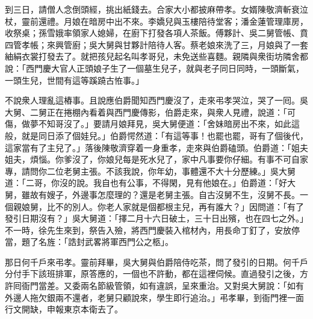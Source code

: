 到三日，請僧人念倒頭經，挑出紙錢去。合家大小都披麻帶孝。女婿陳敬濟斬衰泣杖，靈前還禮。月娘在暗房中出不來。李嬌兒與玉樓陪待堂客；潘金蓮管理庫房，收祭桌；孫雪娥率領家人媳婦，在廚下打發各項人茶飯。傅夥計、吳二舅管帳、賁四管孝帳；來興管廚；吳大舅與甘夥計陪待人客。蔡老娘來洗了三，月娘與了一套紬絹衣裳打發去了。就把孩兒起名叫孝哥兒，未免送些喜麵。親隣與衆街坊隣舍都說：「西門慶大官人正頭娘子生了一個墓生兒子，就與老子同日同時，一頭斷氣，一頭生兒，世間有這等蹊蹺古恠事。」

不說衆人理亂這樁事。且說應伯爵聞知西門慶沒了，走來弔孝哭泣，哭了一囘。吳大舅、二舅正在捲棚內看着與西門慶傳影，伯爵走來，與衆人見禮，說道：「可傷，做夢不知哥沒了。」要請月娘拜見，吳大舅便道：「舍妹暗房出不來，如此這般，就是同日添了個娃兒。」伯爵愕然道：{}「有這等事！也罷也罷，哥有了個後代，這家當有了主兒了。」落後陳敬濟穿着一身重孝，走來與伯爵磕頭。伯爵道：「姐夫姐夫，煩惱。你爹沒了，你娘兒每是死水兒了，家中凡事要你仔細。有事不可自家專，請問你二位老舅主張。不該我說，你年幼，事體還不大十分歷練。」{}吳大舅道：「二哥，你沒的說。我自也有公事，不得閑，見有他娘在。」伯爵道：「好大舅，雖故有嫂子，外邊事怎麼理的？還是老舅主張。自古沒舅不生，沒舅不長。一個親娘舅，比不的別人。你老人家就是個都根主兒，再有誰大？」{}因問道：「有了發引日期沒有？」吳大舅道：「擇二月十六日破土，三十日出殯，也在四七之外。」不一時，徐先生來到，祭告入殮，將西門慶裝入棺材內，用長命丁釘了，安放停當，題了名旌：「誥封武畧將軍西門公之柩」。

那日何千戶來弔孝。靈前拜畢，吳大舅與伯爵陪侍吃茶，問了發引的日期。何千戶分付手下該班排軍，原答應的，一個也不許動，都在這裡伺候。直過發引之後，方許囘衙門當差。又委兩名節級管領，如有違誤，呈來重治。又對吳大舅說：「如有外邊人拖欠銀兩不還者，老舅只顧說來，學生即行追治。」{}弔孝畢，到衙門裡一面行文開缺，申報東京本衛去了。

